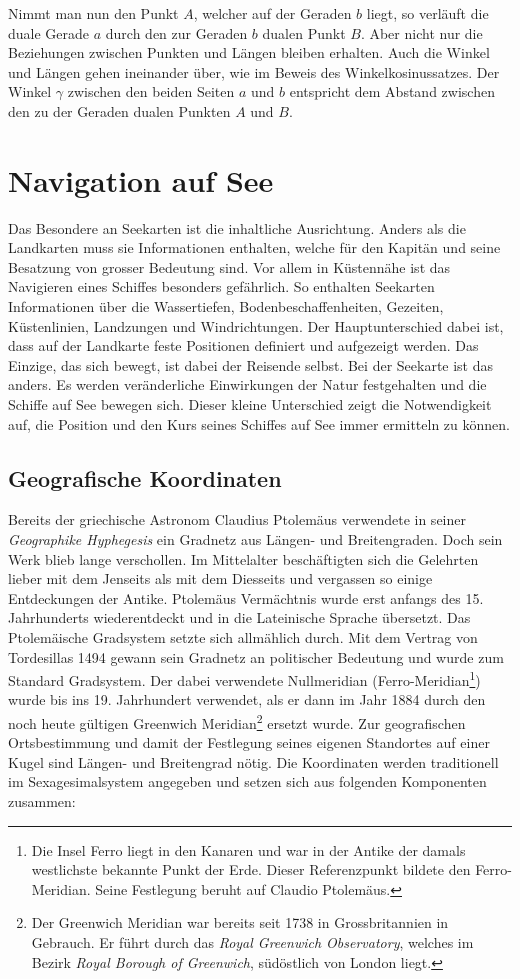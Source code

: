 \begin{refsection}
Nimmt man nun den Punkt $A$, welcher auf der Geraden $b$ liegt, so verläuft die duale Gerade $a$ durch den zur Geraden $b$ dualen Punkt $B$. 
Aber nicht nur die Beziehungen zwischen Punkten und Längen bleiben erhalten. Auch die Winkel und Längen gehen ineinander über, wie im Beweis des Winkelkosinussatzes.
Der Winkel $\gamma$ zwischen den beiden Seiten $a$ und $b$ entspricht dem Abstand zwischen den zu der Geraden dualen Punkten $A$ und $B$.



\section{Navigation auf See}
Das Besondere an Seekarten ist die inhaltliche Ausrichtung. Anders als die Landkarten muss sie Informationen enthalten, welche für den Kapitän und seine Besatzung von grosser Bedeutung sind. Vor allem in Küstennähe ist das Navigieren eines Schiffes besonders gefährlich. So enthalten Seekarten Informationen über die Wassertiefen, Bodenbeschaffenheiten, Gezeiten, Küstenlinien, Landzungen und Windrichtungen.
Der Hauptunterschied dabei ist, dass auf der Landkarte feste Positionen definiert und aufgezeigt werden. Das Einzige, das sich bewegt, ist dabei der Reisende selbst. Bei der Seekarte ist das anders. Es werden veränderliche Einwirkungen der Natur festgehalten und die Schiffe auf See bewegen sich.
Dieser kleine Unterschied zeigt die Notwendigkeit auf, die Position und den Kurs seines Schiffes auf See immer ermitteln zu können.


\subsection{Geografische Koordinaten}
Bereits der griechische Astronom Claudius Ptolemäus verwendete in seiner \textit{Geographike Hyphegesis} ein Gradnetz aus Längen- und Breitengraden. Doch sein Werk  blieb lange verschollen. Im Mittelalter beschäftigten sich die Gelehrten lieber mit dem Jenseits als mit dem Diesseits und vergassen so einige Entdeckungen der Antike.
Ptolemäus Vermächtnis wurde erst anfangs des 15. Jahrhunderts wiederentdeckt und in die Lateinische Sprache übersetzt. Das Ptolemäische Gradsystem setzte sich allmählich durch.
Mit dem Vertrag von Tordesillas 1494 gewann sein Gradnetz an politischer Bedeutung und wurde zum Standard Gradsystem. Der dabei verwendete Nullmeridian (Ferro-Meridian\footnote{%
Die Insel Ferro liegt in den Kanaren und war in der Antike der damals westlichste bekannte Punkt der Erde. Dieser Referenzpunkt bildete den Ferro-Meridian. Seine Festlegung beruht auf Claudio Ptolemäus.}) wurde bis ins 19. Jahrhundert verwendet, als er dann im Jahr 1884 durch den noch heute gültigen Greenwich Meridian\footnote{%
Der Greenwich Meridian war bereits seit 1738 in Grossbritannien in Gebrauch. Er führt durch das \textit{Royal Greenwich Observatory}, welches im Bezirk \textit{Royal Borough of Greenwich}, südöstlich von London liegt.}
ersetzt wurde.
Zur geografischen Ortsbestimmung und damit der Festlegung seines eigenen Standortes auf einer Kugel sind Längen- und Breitengrad nötig. 
Die Koordinaten werden traditionell im Sexagesimalsystem angegeben und setzen sich aus folgenden Komponenten zusammen:


\end{refsection}
